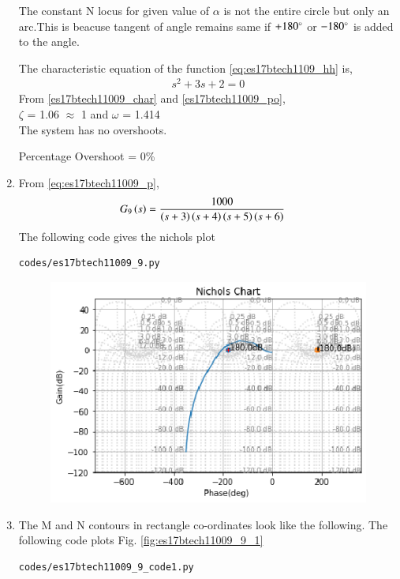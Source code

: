 \begin{enumerate}[label=\thesection.\arabic*.,ref=\thesection.\theenumi]
The constant N locus for given value of $\alpha$ is not the entire circle but only an arc.This is beacuse tangent of angle remains same if $+180\degree$ or 
$-180\degree$ is added to the angle.

The characteristic equation of the function \eqref{eq:es17btech1109_hh} is,
\begin{align}
 s^2 + 3s + 2 = 0
 \end{align}
From \eqref{es17btech11009_char} and \eqref{es17btech11009_po},
\\
  $\zeta$ = 1.06 $\approx$ 1 and $\omega$ = 1.414
  \\
  The system has no overshoots.
  
  Percentage Overshoot = 0\%
\\
\item
From \eqref{eq:es17btech11009_p},
\begin{align}
G_9\brak{s} &=\frac{1000}{\brak{s+3}\brak{s+4}\brak{s+5}\brak{s+6}}
\label{eq:es17btech11009_ii}
\end{align}
\solution 
The following code gives the nichols plot
\begin{lstlisting}
codes/es17btech11009_9.py
\end{lstlisting}

\begin{figure}[!h]
\includegraphics[width=\columnwidth]{./figs/es17btech11009_9.eps}
\caption{}
\label{fig:es17btech11009_9}
\end{figure}

\item
The M and N contours in rectangle co-ordinates look like the following.
The following code plots Fig. \ref{fig:es17btech11009_9_1}
\begin{lstlisting}
codes/es17btech11009_9_code1.py
\end{lstlisting}


\end{enumerate}

